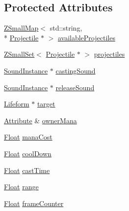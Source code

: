 \subsection*{Protected Attributes}
\begin{DoxyCompactItemize}
\item 
\hyperlink{namespaceZeta_a4c11e23ddc559dccdb5e85901d7dfb84}{Z\+Small\+Map}$<$ std\+::string, \\*
\hyperlink{classZeta_1_1Projectile}{Projectile} $\ast$ $>$ \hyperlink{classZeta_1_1ActiveAbility_a5f3cc050a91d4426eff5b876bd3b5cd0}{available\+Projectiles}
\item 
\hyperlink{namespaceZeta_a44c717c98a964d0ebf6ea954cb9c91bf}{Z\+Small\+Set}$<$ \hyperlink{classZeta_1_1Projectile}{Projectile} $\ast$ $>$ \hyperlink{classZeta_1_1ActiveAbility_a62d796d7d80e14fe2b9f4c7d245c1ea6}{projectiles}
\item 
\hyperlink{classZeta_1_1SoundInstance}{Sound\+Instance} $\ast$ \hyperlink{classZeta_1_1ActiveAbility_a5383a436ae261b80675f20034816a22f}{casting\+Sound}
\item 
\hyperlink{classZeta_1_1SoundInstance}{Sound\+Instance} $\ast$ \hyperlink{classZeta_1_1ActiveAbility_a6d77d8fa73fb84a4424ed4e0e2424dcd}{release\+Sound}
\item 
\hyperlink{classZeta_1_1Lifeform}{Lifeform} $\ast$ \hyperlink{classZeta_1_1ActiveAbility_a8fa764979494dc8c1a482d61fd701f0a}{target}
\item 
\hyperlink{classZeta_1_1Attribute}{Attribute} \& \hyperlink{classZeta_1_1ActiveAbility_a5936f29e808d3878b4f83c2dae8af85f}{owner\+Mana}
\item 
\hyperlink{namespaceZeta_a1e0a1265f9b3bd3075fb0fabd39088ba}{Float} \hyperlink{classZeta_1_1ActiveAbility_a6c8fca9f95c29edce442d557da31c97c}{mana\+Cost}
\item 
\hyperlink{namespaceZeta_a1e0a1265f9b3bd3075fb0fabd39088ba}{Float} \hyperlink{classZeta_1_1ActiveAbility_ac4948af3377c964955adce51f87fb7f7}{cool\+Down}
\item 
\hyperlink{namespaceZeta_a1e0a1265f9b3bd3075fb0fabd39088ba}{Float} \hyperlink{classZeta_1_1ActiveAbility_ab501566943e05f567f2d79426cf04e84}{cast\+Time}
\item 
\hyperlink{namespaceZeta_a1e0a1265f9b3bd3075fb0fabd39088ba}{Float} \hyperlink{classZeta_1_1ActiveAbility_a556c513b5f222362222237baa86ef99b}{range}
\item 
\hyperlink{namespaceZeta_a1e0a1265f9b3bd3075fb0fabd39088ba}{Float} \hyperlink{classZeta_1_1ActiveAbility_a1d19f65b04e8c7222854cfeae31aad06}{frame\+Counter}

\end{DoxyCompactItemize}
